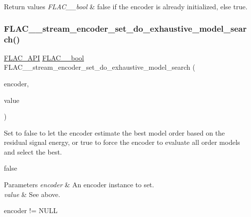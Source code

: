 \begin{DoxyRetVals}{Return values}
{\em F\+L\+A\+C\+\_\+\+\_\+bool} & {\ttfamily false} if the encoder is already initialized, else {\ttfamily true}. \\
\hline
\end{DoxyRetVals}
\mbox{\label{group__flac__stream__encoder_ga7fbc05ec9abd249a400fccb9f189e55e}} 
\subsubsection{\texorpdfstring{F\+L\+A\+C\+\_\+\+\_\+stream\+\_\+encoder\+\_\+set\+\_\+do\+\_\+exhaustive\+\_\+model\+\_\+search()}{FLAC\_\_stream\_encoder\_set\_do\_exhaustive\_model\_search()}}
{\footnotesize\ttfamily \hyperlink{group__flac__export_ga56ca07df8a23310707732b1c0007d6f5}{F\+L\+A\+C\+\_\+\+A\+PI} \hyperlink{ordinals_8h_a95103469f1cbd78b8cf250194985b34e}{F\+L\+A\+C\+\_\+\+\_\+bool} F\+L\+A\+C\+\_\+\+\_\+stream\+\_\+encoder\+\_\+set\+\_\+do\+\_\+exhaustive\+\_\+model\+\_\+search (\begin{DoxyParamCaption}\item[{\hyperlink{struct_f_l_a_c_____stream_encoder}{F\+L\+A\+C\+\_\+\+\_\+\+Stream\+Encoder} $\ast$}]{encoder,  }\item[{\hyperlink{ordinals_8h_a95103469f1cbd78b8cf250194985b34e}{F\+L\+A\+C\+\_\+\+\_\+bool}}]{value }\end{DoxyParamCaption})}

Set to {\ttfamily false} to let the encoder estimate the best model order based on the residual signal energy, or {\ttfamily true} to force the encoder to evaluate all order models and select the best.

{\ttfamily false} 
\begin{DoxyParams}{Parameters}
{\em encoder} & An encoder instance to set. \\
\hline
{\em value} & See above.  
\begin{DoxyCode}
encoder != NULL 
\end{DoxyCode}
 \\
\hline
\end{DoxyParams}


